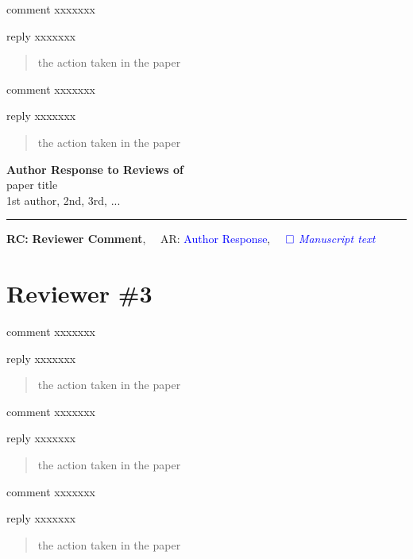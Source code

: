 \documentclass{article}
\def\papertitle{paper title}
\def\authors{1st author, 2nd, 3rd, ...}
\providecommand{\lettertitle}{Author Response to Reviews of}
\providecommand{\papertitle}{Title}
\providecommand{\authors}{Authors}
\providecommand{\journal}{Journal}
\providecommand{\doi}{--}
\def\headall{
{\Large\bf \lettertitle}\\[1em]
{\Large \papertitle}\\[1em]
{\authors}\\
\hrule

\hfill {\bfseries RC:} \textbf{{Reviewer Comment}},\(\quad\) AR: \textcolor{blue}{Author Response}, \(\quad\textcolor{blue}{\square}\) \emph{\textcolor{blue}{Manuscript text}}}
\begin{document}
\RC comment xxxxxxx

\AR reply xxxxxxx
\begin{quote}
	the action taken in the paper
\end{quote}

\RC comment xxxxxxx

\AR reply xxxxxxx
\begin{quote}
	the action taken in the paper
\end{quote}






\newpage
\headall
\section{Reviewer \#3}

\RC comment xxxxxxx

\AR reply xxxxxxx
\begin{quote}
	the action taken in the paper
\end{quote}

\RC comment xxxxxxx

\AR reply xxxxxxx
\begin{quote}
	the action taken in the paper
\end{quote}

\RC comment xxxxxxx

\AR reply xxxxxxx
\begin{quote}
	the action taken in the paper
\end{quote}
\end{document}
